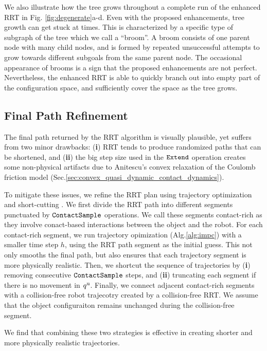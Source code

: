 We also illustrate how the tree grows throughout a complete run of the enhanced RRT in Fig. \ref{fig:degenerate}a-d. Even with the proposed enhancements, tree growth can get stuck at times. This is characterized by a specific type of subgraph of the tree which we call a ``broom''. A broom consists of one parent node with many child nodes, and is formed by repeated unsuccessful attempts to grow towards different subgoals from the same parent node. The occasional appearance of brooms is a sign that the proposed enhancements are not perfect. Nevertheless, the enhanced RRT is able to quickly branch out into empty part of the configuration space, and sufficiently cover the space as the tree grows. 

\subsection{Final Path Refinement}

The final path returned by the RRT algorithm is visually plausible, yet suffers from two minor drawbacks: (\textbf{i}) RRT tends to produce randomized paths that can be shortened, and (\textbf{ii}) the big step size used in the $\mathtt{Extend}$ operation creates some non-physical artifacts due to Anitescu’s convex relaxation of the Coulomb friction model (Sec.\ref{sec:convex_quasi_dynamic_contact_dynamics}). 

To mitigate these issues, we refine the RRT plan using trajectory optimization \cite{lgp,terry} and short-cutting \cite{shortcutting}. 
We first divide the RRT path into different segments punctuated by $\mathtt{ContactSample}$ operations. We call these segments contact-rich as they involve conact-based interactions between the object and the robot. 
For each contact-rich segment, we run trajectory opimization (Alg.\ref{alg:impc}) with a smaller time step $h$, using the RRT path segment as the initial guess. This not only smooths the final path, but also ensures that each trajectory segment is more physically realistic.
Then, we shortcut the sequence of trajectories by (\textbf{i}) removing consecutive $\mathtt{ContactSample}$ steps, and (\textbf{ii}) truncating each segment if there is no movement in ${q^\mathrm{u}}$. 
Finally, we connect adjacent contact-rich segments with a collision-free robot trajecotry created by a collision-free RRT. We assume that the object configuraiton remains unchanged during the collision-free segment.

We find that combining these two strategies is effective in creating shorter and more physically realistic trajectories. 


